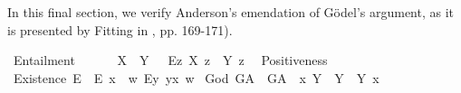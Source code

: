 %
\begin{isabellebody}%
%
%
%
%
%
%
%
%
\isamarkuptrue%
%
\begin{isamarkuptext}%
In this final section, we verify Anderson's emendation of G\"odel's argument, as it is presented
 by Fitting in \cite{Fitting}, pp. 169-171).%
\end{isamarkuptext}\isamarkuptrue%
\isamarkupfalse%
\ Entailment{\isacharcolon}{\isacharcolon}{\isachardoublequoteopen}{\isasymup}{\isasymlangle}{\isasymup}{\isasymlangle}{\isasymzero}{\isasymrangle}{\isacharcomma}{\isasymup}{\isasymlangle}{\isasymzero}{\isasymrangle}{\isasymrangle}{\isachardoublequoteclose}\ {\isacharparenleft}\ {\isachardoublequoteopen}{\isasymRrightarrow}{\isachardoublequoteclose}\ {}{}{\isacharparenright}\ \isanewline
\ \ {\isachardoublequoteopen}X\ {\isasymRrightarrow}\ Y\ {\isasymequiv}\ \ \isactrlbold {\isasymbox}{\isacharparenleft}\isactrlbold {\isasymforall}\isactrlsup Ez{\isachardot}\ X\ z\ \isactrlbold {\isasymrightarrow}\ Y\ z{\isacharparenright}{\isachardoublequoteclose}\ \isanewline
{}\isamarkupfalse%
\ Positiveness{\isacharcolon}{\isacharcolon}{\isachardoublequoteopen}{\isasymup}{\isasymlangle}{\isasymup}{\isasymlangle}{\isasymzero}{\isasymrangle}{\isasymrangle}{\isachardoublequoteclose}\ {\isacharparenleft}{\isachardoublequoteopen}{\isasymP}{\isachardoublequoteclose}{\isacharparenright}\isanewline
{}\isamarkupfalse%
\ Existence{\isacharcolon}{\isacharcolon}{\isachardoublequoteopen}{\isasymup}{\isasymlangle}{\isasymzero}{\isasymrangle}{\isachardoublequoteclose}\ {\isacharparenleft}{\isachardoublequoteopen}E{\isacharbang}{\isachardoublequoteclose}{\isacharparenright}\ \ {\isachardoublequoteopen}E{\isacharbang}\ x\ {\isasymequiv}\ {\isasymlambda}w{\isachardot}\ {\isacharparenleft}\isactrlbold {\isasymexists}\isactrlsup Ey{\isachardot}\ y\isactrlbold {\isasymapprox}x{\isacharparenright}\ w{\isachardoublequoteclose}\isanewline
{}\isamarkupfalse%
\ God{\isacharcolon}{\isacharcolon}{\isachardoublequoteopen}{\isasymup}{\isasymlangle}{\isasymzero}{\isasymrangle}{\isachardoublequoteclose}\ {\isacharparenleft}{\isachardoublequoteopen}G\isactrlsup A{\isachardoublequoteclose}{\isacharparenright}\ \ {\isachardoublequoteopen}G\isactrlsup A\ {\isasymequiv}\ {\isasymlambda}x{\isachardot}\ \isactrlbold {\isasymforall}Y{\isachardot}\ {\isacharparenleft}{\isasymP}\ Y{\isacharparenright}\ \isactrlbold {\isasymleftrightarrow}\ \isactrlbold {\isasymbox}{\isacharparenleft}Y\ x{\isacharparenright}{\isachardoublequoteclose}%

\end{isabellebody}
